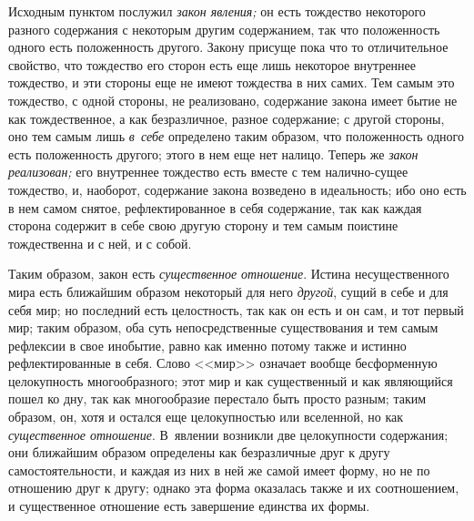 Исходным пунктом послужил {\em закон явления;} он есть
тождество некоторого разного содержания с некоторым другим содержанием, так
что положенность одного есть положенность другого. Закону присуще пока что
то отличительное свойство, что тождество его сторон есть еще лишь некоторое
внутреннее тождество, и эти стороны еще не имеют тождества в них самих. Тем
самым это тождество, с одной стороны, не реализовано, содержание закона
имеет бытие не как тождественное, а как безразличное, разное содержание; с
другой стороны, оно тем самым лишь {\em в~себе}
определено таким образом, что положенность одного есть положенность
другого; этого в нем еще нет налицо. Теперь же
{\em закон реализован;} его внутреннее тождество есть
вместе с тем налично-сущее тождество, и, наоборот, содержание закона
возведено в идеальность; ибо оно есть в нем самом снятое, рефлектированное
в себя содержание, так как каждая сторона содержит в себе свою другую
сторону и тем самым поистине тождественна и с ней, и с собой.

Таким образом, закон есть {\em существенное отношение}.
Истина несущественного мира есть ближайшим образом некоторый для него
{\em другой}, сущий в себе и для себя мир; но последний
есть целостность, так как он есть и он сам, и тот первый мир; таким
образом, оба суть непосредственные существования и тем самым рефлексии в
свое инобытие, равно как именно потому также и истинно рефлектированные в
себя. Слово <<мир>> означает вообще бесформенную целокупность многообразного;
этот мир и как существенный и как являющийся пошел ко дну, так как
многообразие перестало быть просто разным; таким образом, он, хотя и
остался еще целокупностью или вселенной, но как
{\em существенное отношение}. В~явлении возникли две
целокупности содержания; они ближайшим образом определены как безразличные
друг к другу самостоятельности, и каждая из них в ней же самой имеет форму,
но не по отношению друг к другу; однако эта форма оказалась также и их
соотношением, и существенное отношение есть завершение единства их формы.

